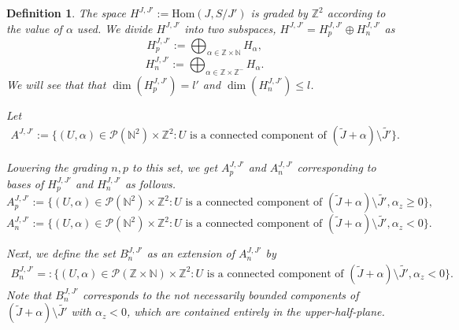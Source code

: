 \documentclass[10pt,a4paper]{amsart}
\newtheorem{definition}{Definition}
\begin{document}
\begin{definition}\label{Def:AJ}
The space $H^{J,J'}:=\mathrm{Hom}(J,S/J')$ is graded by $\mathbb{Z}^2$ according to the value of $\alpha$ used. We divide $H^{J,J'}$ into two subspaces, $H^{J,J'}=H^{J,J'}_p\oplus H^{J,J'}_n$ as
\[H^{J,J'}_p:=\bigoplus_{\alpha\in\mathbb{Z}\times\mathbb{N}}H_\alpha,\]
\[H^{J,J'}_n:=\bigoplus_{\alpha\in\mathbb{Z}\times\mathbb{Z}^-}H_\alpha.\]
We will see that that $\dim(H^{J,J'}_p)=l'$ and $\dim(H^{J,J'}_n)\leq l$. 

Let
\begin{align*}   
A^{J,J'}:=\{(U,\alpha)\in\mathcal{P}(\mathbb{N}^2)\times\mathbb{Z}^2:U\text{ is a connected component of }(\tilde{J}+\alpha)\setminus \tilde{J'}\}.\end{align*}

Lowering the grading $n,p$ to this set,  we get $A^{J,J'}_p$ and $A^{J,J'}_n$ corresponding to bases of $H^{J,J'}_p$ and $H^{J,J'}_n$ as follows. 
\[A^{J,J'}_p:=\{(U,\alpha)\in\mathcal{P}(\mathbb{N}^2)\times\mathbb{Z}^2:U\text{ is a connected component of }(\tilde{J}+\alpha)\setminus \tilde{J'},\alpha_z\geq 0\},\]
\[A^{J,J'}_n:=\{(U,\alpha)\in\mathcal{P}(\mathbb{N}^2)\times\mathbb{Z}^2:U\text{ is a connected component of }(\tilde{J}+\alpha)\setminus \tilde{J'},\alpha_z<0\}.\]

Next, we define the set $B^{J,J'}_n$ as an extension of $A^{J,J'}_n$ by
\begin{align*}    
B^{J,J'}_n=:\{(U,\alpha)\in\mathcal{P}(\mathbb{Z}\times\mathbb{N})\times\mathbb{Z}^2:U\text{ is a connected component of } ( \tilde{J}+\alpha)\setminus\tilde{J'},\alpha_z<0\}.\end{align*}
Note that $B^{J,J'}_n$ corresponds to the not necessarily bounded components of $(\tilde{J}+\alpha)\setminus\tilde{J'}$ with $\alpha_z<0$, which are contained entirely in the upper-half-plane.


    
\end{definition}
\end{document}
